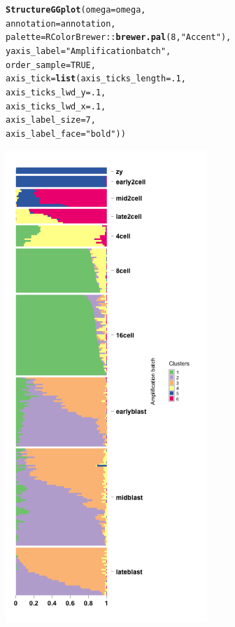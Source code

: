 \documentclass[12pt]{article}\usepackage[]{graphicx}\usepackage[usenames,dvipsnames]{color}
\makeatletter
\newcommand{\hlnum}[1]{\textcolor[rgb]{0.686,0.059,0.569}{#1}}%
\newcommand{\hlstr}[1]{\textcolor[rgb]{0.192,0.494,0.8}{#1}}%
\newcommand{\hlopt}[1]{\textcolor[rgb]{0,0,0}{#1}}%
\newcommand{\hlstd}[1]{\textcolor[rgb]{0.345,0.345,0.345}{#1}}%
\newcommand{\hlkwc}[1]{\textcolor[rgb]{0.333,0.667,0.333}{#1}}%
\newcommand{\hlkwd}[1]{\textcolor[rgb]{0.737,0.353,0.396}{\textbf{#1}}}%
\newenvironment{kframe}{%
 \def\at@end@of@kframe{}%
 \ifinner\ifhmode%
  \def\at@end@of@kframe{\end{minipage}}%
  \begin{minipage}{\columnwidth}%
 \fi\fi%
 \def\FrameCommand##1{\hskip\@totalleftmargin \hskip-\fboxsep
 \colorbox{shadecolor}{##1}\hskip-\fboxsep
     \hskip-\linewidth \hskip-\@totalleftmargin \hskip\columnwidth}%
 \MakeFramed {\advance\hsize-\width
   \@totalleftmargin\z@ \linewidth\hsize
   \@setminipage}}%
 {\par\unskip\endMakeFramed%
 \at@end@of@kframe}
\newenvironment{knitrout}{}{} %
\makeatother
\begin{document}
\begin{figure}[h]
\begin{center}
\begin{knitrout}
\color{fgcolor}\begin{kframe}
\begin{alltt}
\hlkwd{StructureGGplot}\hlstd{(}\hlkwc{omega} \hlstd{= omega,}
                \hlkwc{annotation} \hlstd{= annotation,}
                \hlkwc{palette} \hlstd{= RColorBrewer}\hlopt{::}\hlkwd{brewer.pal}\hlstd{(}\hlnum{8}\hlstd{,} \hlstr{"Accent"}\hlstd{),}
                \hlkwc{yaxis_label} \hlstd{=} \hlstr{"Amplification batch"}\hlstd{,}
                \hlkwc{order_sample} \hlstd{=} \hlnum{TRUE}\hlstd{,}
                \hlkwc{axis_tick} \hlstd{=} \hlkwd{list}\hlstd{(}\hlkwc{axis_ticks_length} \hlstd{=} \hlnum{.1}\hlstd{,}
                                 \hlkwc{axis_ticks_lwd_y} \hlstd{=} \hlnum{.1}\hlstd{,}
                                 \hlkwc{axis_ticks_lwd_x} \hlstd{=} \hlnum{.1}\hlstd{,}
                                 \hlkwc{axis_label_size} \hlstd{=} \hlnum{7}\hlstd{,}
                                 \hlkwc{axis_label_face} \hlstd{=} \hlstr{"bold"}\hlstd{))}
\end{alltt}
\end{kframe}
\includegraphics[width=3in,height=7in]{figure/plot_topic_deng-1} 

\end{knitrout}
\end{center}
\end{figure}
\end{document}
